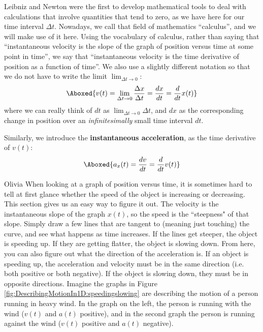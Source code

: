 Leibniz and Newton were the first to develop mathematical tools to deal with calculations that involve quantities that tend to zero, as we have here for our time interval $\Delta t$. Nowadays, we call that field of mathematics ``calculus'', and we will make use of it here. Using the vocabulary of calculus, rather than saying that ``instantaneous velocity is the slope of the graph of position versus time at some point in time'', we say that ``instantaneous velocity is the time derivative of position as a function of time''. We also use a slightly different notation so that we do not have to write the limit $\lim_{\Delta t\to 0}$:
\begin{align}
\label{eqn:DescribingMotionIn1D:vdef}
\Aboxed{v(t)=\lim_{\Delta t\to 0} \frac{\Delta x}{\Delta t}=\frac{dx}{dt}=\frac{d}{dt} x(t)}
\end{align}
where we can really think of $dt$ as $\lim_{\Delta t\to 0}\Delta t$, and $dx$ as the corresponding change in position over an \textit{infinitesimally} small time interval $dt$.

Similarly, we introduce the \textbf{instantaneous acceleration}, as the time derivative of $v(t)$:
\begin{align}
\Aboxed{a_x(t)=\frac{dv}{dt}=\frac{d}{dt}v(t)}
\end{align}

\begin{studentOpinion}{Olivia}
When looking at a graph of position versus time, it is sometimes hard to tell at first glance whether the speed of the object is increasing or decreasing. This section gives us an easy way to figure it out. The velocity is the instantaneous slope of the graph $x(t)$, so the speed is the ``steepness" of that slope. Simply draw a few lines that are tangent to (meaning just touching) the curve, and see what happens as time increases. If the lines get steeper, the object is speeding up. If they are getting flatter, the object is slowing down.
From here, you can also figure out what the direction of the acceleration is. If an object is speeding up, the acceleration and velocity must be in the same direction (i.e. both positive or both negative). If the object is slowing down, they must be in opposite directions. Imagine the graphs in Figure \ref{fig:DescribingMotionIn1D:speedingslowing} are describing the motion of a person running in heavy wind. In the graph on the left, the person is running with the wind ($v(t)$ and $a(t)$ positive), and in the second graph the person is running against the wind ($v(t)$ positive and $a(t)$ negative). 
\end{studentOpinion} 



